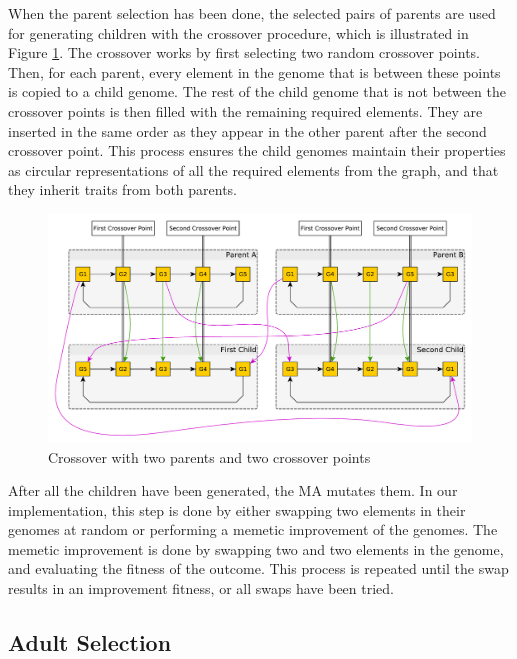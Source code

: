 When the parent selection has been done, the selected pairs of parents are used for generating children with the crossover procedure, which is illustrated in Figure \ref{fig:crossover_illustration}. The crossover works by first selecting two random crossover points. Then, for each parent, every element in the genome that is between these points is copied to a child genome. The rest of the child genome that is not between the crossover points is then filled with the remaining required elements. They are inserted in the same order as they appear in the other parent after the second crossover point. This process ensures the child genomes maintain their properties as circular representations of all the required elements from the graph, and that they inherit traits from both parents.

\begin{figure}[thbp]
    \centerline{\includegraphics[width=\textwidth]{figures/Architecture/Crossover_Illustration.pdf}}
    \caption{Crossover with two parents and two crossover points}
    \label{fig:crossover_illustration}
\end{figure}

After all the children have been generated, the MA mutates them. In our implementation, this step is done by either swapping two elements in their genomes at random or performing a memetic improvement of the genomes. The memetic improvement is done by swapping two and two elements in the genome, and evaluating the fitness of the outcome. This process is repeated until the swap results in an improvement fitness, or all swaps have been tried.

\subsection{Adult Selection} %
\label{sub:achitecture_adult_selection}

